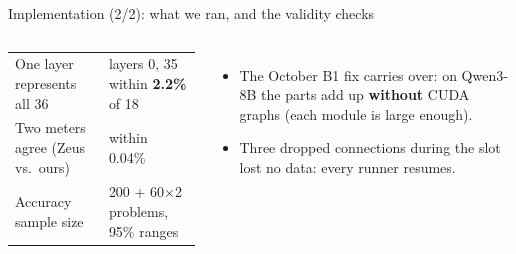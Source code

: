 \documentclass[aspectratio=169,9pt]{beamer}
\newcommand{\x}{$\times$}
\begin{document}
\begin{frame}{Implementation (2/2): what we ran, and the validity checks}
\begin{columns}[T,onlytextwidth]
\begin{tabular}{@{}L{0.50\textwidth}L{0.42\textwidth}@{}}
      One layer represents all 36 & layers 0, 35 within \textbf{2.2\%} of 18 \\
      Two meters agree (Zeus vs.\ ours) & within 0.04\% \\
      Accuracy sample size & 200 + 60\x2 problems, 95\% ranges \\
      \bottomrule
    \end{tabular}
    \vspace{4pt}
    \begin{itemize}\scriptsize
      \item The October B1 fix carries over: on Qwen3-8B the parts add up \textbf{without} CUDA graphs (each module is large enough).
      \item Three dropped connections during the slot lost no data: every runner resumes.
    \end{itemize}
  \end{columns}
\end{frame}
\end{document}
